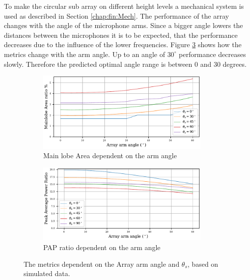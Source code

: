 \newpage
To make the circular sub array on different height levels
a mechanical system is used as described in Section \ref{chap:fin:Mech}.
The performance of the array changes with the angle of the microphone arms.
Since a bigger angle lowers the distances between the microphones it is to be
expected, that the performance decreases due to the influence of the lower frequencies.
Figure \ref{fig:fintilt} shows how the metrics change with the arm angle.
Up to an angle of $30^\circ$ performance decreases slowly.
Therefore the predicted optimal angle range is between 0 and 30 degrees.
\begin{figure}[h!]
	\centering
	\begin{subfigure}[b]{1\textwidth}
		\centering
		\includegraphics[width=0.93\textwidth]{images/5_array_evaluation/tilt_area.pdf}
		\caption{Main lobe Area dependent on the arm angle}
		\label{fig:finartilt}
	\end{subfigure}
	\begin{subfigure}[b]{1\textwidth}
		\centering
		\includegraphics[width=0.93\textwidth]{images/5_array_evaluation/tilt_PAP.pdf}
		\caption{PAP ratio dependent on the arm angle}
		\label{fig:finpaptilt}
	\end{subfigure}
	\caption{The metrics dependent on the Array arm angle and $\theta_s$, based
		on simulated data.}
	\label{fig:fintilt}
\end{figure}
